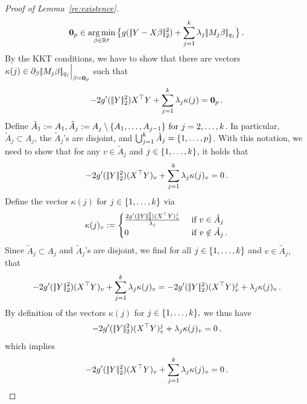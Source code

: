 \documentclass[bj]{imsart}
\newcommand{\normtwo}[1]{\ensuremath{\!|\!| #1 | \! |_{2}}}
\newcommand{\normqj}[1]{\ensuremath{\!|\!| #1 | \! |_{q_j}}}
\newcommand{\1}{{\rm 1}\mskip -4,5mu{\rm l} }
\newcommand{\argmin}{\mathop{\mathrm{arg\,min}}}
\def\R{\mathbb{R}}
\begin{document}
\begin{proof}[Proof of Lemma~\ref{re:existence}]
\begin{equation*}
\bold{0}_p\in \argmin_{\beta\in\R^p} \big\{ g(\,\normtwo{\outcome-\design\beta}^2)+\sum_{j=1}^\numbergroups\lambda_j\,\normqj{\fusedmatrix_j\beta}\big\}\,.
\end{equation*}
By the KKT conditions, we have to show that there are vectors $\kappa(j)\in\partial_{\beta}\,\normqj{\fusedmatrix_j\beta}\Big|_{\beta=\bold{0}_p}$ such that 
\begin{equation}
\label{eq:subdiff1}
-2g'(\,\normtwo{\outcome}^2)\design^\top \outcome+\sum_{j=1}^\numbergroups\lambda_j \kappa(j)=\bold{0}_p\,.
\end{equation}
 Define $\tilde A_1:=A_1, \tilde A_j:=A_j\setminus \{A_1,\dots,A_{j-1}\} \text{ for } j=2,\dots,k$. In particular, $\tilde A_j\subset A_j$, the $\tilde A_j$'s are disjoint, and $\bigcup_{j=1}^{k} \tilde A_j=\{1,\dots,p\}$. 
With this notation, we need to show that for any $v\in\tilde A_j$ and $j\in\{1,\dots,k\}$, it holds that 
\begin{align*}
-2g'(\,\normtwo{\outcome}^2)(\design^\top \outcome)_v+\sum_{j=1}^\numbergroups\lambda_j \kappa(j)_v=0\,.
\end{align*}
Define the vector $\kappa(j)$ for $j\in\{1,\dots,k\}$ via
\begin{align*}
\kappa(j)_v:=\begin{cases}
\frac{2g'(\,\normtwo{\outcome}^2)(\design^\top \outcome)^j_v}{\lambda_j} &\text{ if } v\in \tilde A_j \\ 
0 & \text{ if } v\notin \tilde A_j \,.
\end{cases}
\end{align*}
Since $\tilde A_j\subset A_j$ and $\tilde A_j$'s are disjoint, we find for all $j\in\{1,\dots,k\}$ and $v\in \tilde A_j,$ that
\begin{align*}
-2g'(\,\normtwo{\outcome}^2)(\design^\top \outcome)_v+\sum_{j=1}^\numbergroups\lambda_j \kappa(j)_v=-2g'(\,\normtwo{\outcome}^2)(\design^\top \outcome)^j_v+\lambda_j \kappa(j)_v\,.
\end{align*}
By definition of the vectors $\kappa(j)$ for $j\in\{1,\dots,k\},$ we thus have
\begin{align*}
-2g'(\,\normtwo{\outcome}^2)(\design^\top \outcome)^j_v+\lambda_j \kappa(j)_v=0\,,
\end{align*}
which implies
\begin{align*}
-2g'(\,\normtwo{\outcome}^2)(\design^\top \outcome)_v+\sum_{j=1}^\numbergroups\lambda_j \kappa(j)_v=0\,.
\end{align*}

\end{proof}
\end{document}
